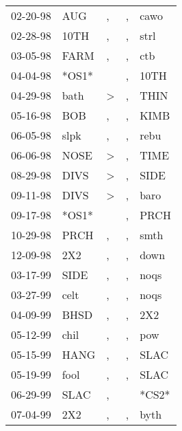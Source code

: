\begin{supertabular}{lllll}
 02-20-98 &    AUG &             , &  , &   cawo \\
 02-28-98 &   10TH &             , &  , &   strl \\
 03-05-98 &   FARM &             , &  , &    ctb \\
 04-04-98 &  *OS1* &               &  , &   10TH \\
 04-29-98 &   bath &  \textgreater &  , &   THIN \\
 05-16-98 &    BOB &             , &  , &   KIMB \\
 06-05-98 &   slpk &             , &  , &   rebu \\
 06-06-98 &   NOSE &  \textgreater &  , &   TIME \\
 08-29-98 &   DIVS &  \textgreater &  , &   SIDE \\
 09-11-98 &   DIVS &  \textgreater &  , &   baro \\
 09-17-98 &  *OS1* &               &  , &   PRCH \\
 10-29-98 &   PRCH &             , &  , &   smth \\
 12-09-98 &    2X2 &             , &  , &   down \\
 03-17-99 &   SIDE &             , &  , &   noqs \\
 03-27-99 &   celt &             , &  , &   noqs \\
 04-09-99 &   BHSD &             , &  , &    2X2 \\
 05-12-99 &   chil &             , &  , &    pow \\
 05-15-99 &   HANG &             , &  , &   SLAC \\
 05-19-99 &   fool &             , &  , &   SLAC \\
 06-29-99 &   SLAC &             , &    &  *CS2* \\
 07-04-99 &    2X2 &             , &  , &   byth \\
\end{supertabular}
